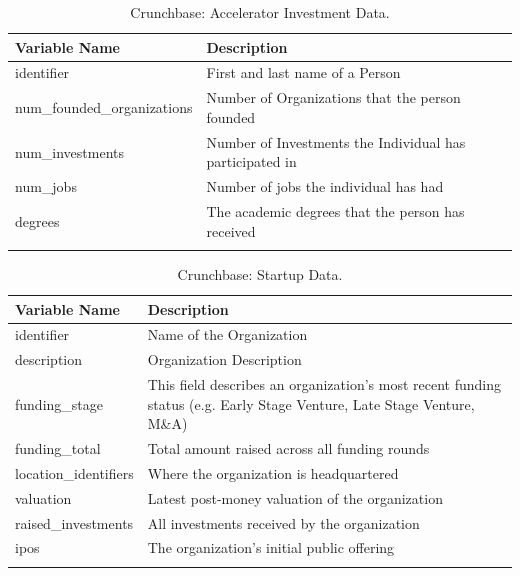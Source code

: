 \documentclass[
  12pt,
]{article}
\begin{document}
\begin{table}[H]

\caption{\label{tab:crunchacceleratorinvestment}Crunchbase: Accelerator Investment Data.}
\centering
\fontsize{9}{11}\selectfont
\begin{tabu} to 
\toprule
Variable Name & Description\\
\midrule
identifier & First and last name of a Person\\
\addlinespace
num\_founded\_organizations & Number of Organizations that the person founded\\
\addlinespace
num\_investments & Number of Investments the Individual has participated in\\
\addlinespace
num\_jobs & Number of jobs the individual has had\\
\addlinespace
degrees & The academic degrees that the person has received\\
\bottomrule
{}\\
\end{tabu}
\end{table}

\begin{table}[H]

\caption{\label{tab:crunchstartup}Crunchbase: Startup Data.}
\centering
\fontsize{9}{11}\selectfont
\begin{tabu} to 
\toprule
Variable Name & Description\\
\midrule
identifier & Name of the Organization\\
\addlinespace
description & Organization Description\\
\addlinespace
funding\_stage & This field describes an organization's most recent funding status (e.g. Early Stage Venture, Late Stage Venture, M\&A)\\
\addlinespace
funding\_total & Total amount raised across all funding rounds\\
\addlinespace
location\_identifiers & Where the organization is headquartered\\
\addlinespace
valuation & Latest post-money valuation of the organization\\
\addlinespace
raised\_investments & All investments received by the organization\\
\addlinespace
ipos & The organization's initial public offering\\
\bottomrule
{}\\
\end{tabu}
\end{table}
\end{document}
